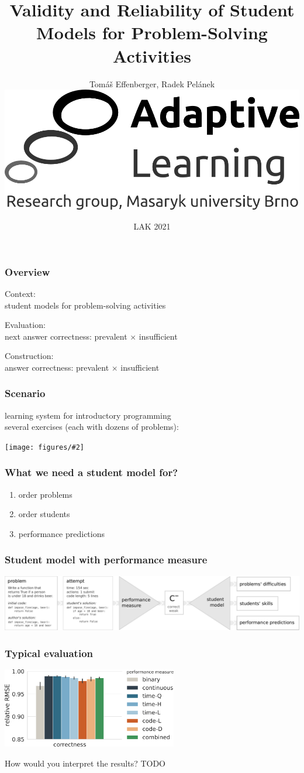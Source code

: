 \documentclass[bigger]{beamer}
\title{Validity and Reliability of Student Models for Problem-Solving Activities}
\author{Tom\'a\v{s} Effenberger, Radek Pel\'anek\\[5mm]
\includegraphics[width=.35\linewidth]{figures/al-logo}\\[3mm]
}
\date{LAK 2021}
\newcommand{\img}[2]{
  \begin{center}
    \texttt{[image: figures/\#2]}
  \end{center}
}
\newcommand{\mute}[1]{
  {\color{gray}{#1}}
}
\begin{document}
\frame{\titlepage}


\begin{frame}
  \frametitle{Overview}

  Context:\\student models for problem-solving activities
  \bigskip
  \pause

  Evaluation:\\
  next answer correctness: prevalent $\times$ insufficient
  \bigskip
  \pause

  Construction:\\
  answer correctness: prevalent $\times$ insufficient
\end{frame}


\begin{frame}
  \frametitle{Scenario}
  learning system for introductory programming\\
  several exercises (each with dozens of problems):
  \img{1.0}{exercises}
\end{frame}


\begin{frame}
  \frametitle{What we need a student model for?}
  \begin{enumerate}
    \item order problems
    \item order students
    \item performance predictions
  \end{enumerate}
\end{frame}


\begin{frame}
  \frametitle{Student model with performance measure}
  \hspace*{-0.9cm}
  \includegraphics[width=1.15\linewidth]{figures/pipeline}
\end{frame}

\begin{frame}
  \frametitle{Typical evaluation}
  \includegraphics[height=3.5cm]{figures/next-answer-correctness}


  \bigskip
  How would you interpret the results?
  \pause
  TODO
\end{frame}
\end{document}
